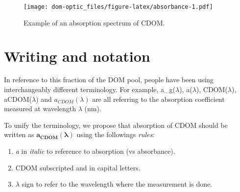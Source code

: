 \documentclass[]{book}
\newenvironment{Shaded}{\begin{snugshade}}{\end{snugshade}}
\newcommand{\KeywordTok}[1]{\textcolor[rgb]{0.13,0.29,0.53}{\textbf{{#1}}}}
\newcommand{\DataTypeTok}[1]{\textcolor[rgb]{0.13,0.29,0.53}{{#1}}}
\newcommand{\DecValTok}[1]{\textcolor[rgb]{0.00,0.00,0.81}{{#1}}}
\newcommand{\StringTok}[1]{\textcolor[rgb]{0.31,0.60,0.02}{{#1}}}
\newcommand{\NormalTok}[1]{{#1}}
\providecommand{\tightlist}{%
  \setlength{\itemsep}{0pt}\setlength{\parskip}{0pt}}
\begin{document}
\begin{Shaded}
\end{Shaded}

\begin{figure}[htbp]
\centering
\texttt{[image: dom-optic\_files/figure-latex/absorbance-1.pdf]}
\caption{\label{fig:absorbance}Example of an absorption spectrum of CDOM.}
\end{figure}

\section{Writing and notation}\label{writing-and-notation}

In reference to this fraction of the DOM pool, people have been using
interchangeably different terminology. For example, a\_g(\(\lambda\)),
a(\(\lambda\)), CDOM(\(\lambda\)), aCDOM(\(\lambda\)) and
\(a_{CDOM}(\lambda)\) are all referring to the absorption coefficient
measured at wavelength \(\lambda\) (nm).

To unify the terminology, we propose that absorption of CDOM should be
written as \(\mathbf{a_{\text{CDOM}}(\lambda)}\) using the followings
\emph{rules}:

\begin{enumerate}
\def\labelenumi{\arabic{enumi}.}
\tightlist
\item
  \emph{a} in \emph{italic} to reference to absorption (vs absorbance).
\item
  CDOM subscripted and in capital letters.
\item
  \(\lambda\) sign to refer to the wavelength where the measurement is
  done.
\end{enumerate}
\end{document}
